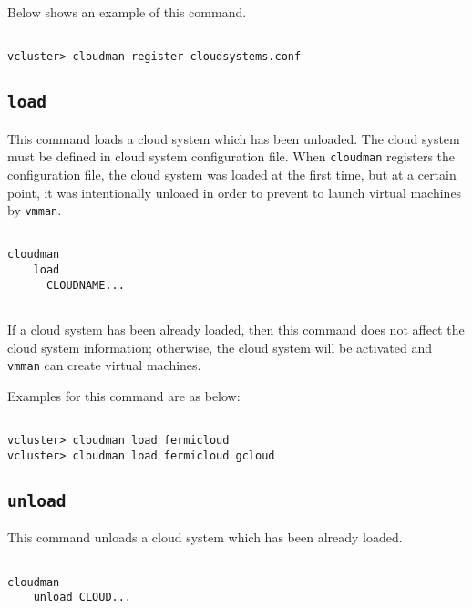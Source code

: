 \documentclass[11pt]{article}
\def \ttt{\texttt}
\def \vb{\verb}
\begin{document}
Below shows an example of this command.

\begin{Verbatim}[fontfamily=courier, fontsize = \small, obeytabs
=true, tabsize=4, frame=lines]

vcluster> cloudman register cloudsystems.conf

\end{Verbatim}



\subsection{\ttt{load}}
This command loads a cloud system which has been unloaded. The cloud system must be defined in cloud system configuration file. When \vb+cloudman+ registers the configuration file, the cloud system was loaded at the first time, but at a certain point, it was intentionally unloaed in order to prevent to launch virtual machines by \vb+vmman+. 

\begin{Verbatim}[fontfamily=courier, fontsize = \small, obeytabs
=true, tabsize=4, frame=lines]

cloudman 
    load
      CLOUDNAME... 
      
\end{Verbatim}

If a cloud system has been already loaded, then this command does not affect the cloud system information; otherwise, the cloud system will be activated and \vb+vmman+ can create virtual machines. 

Examples for this command are as below:


\begin{Verbatim}[fontfamily=courier, fontsize = \small, obeytabs
=true, tabsize=4, frame=lines]

vcluster> cloudman load fermicloud
vcluster> cloudman load fermicloud gcloud

\end{Verbatim}


\subsection{\ttt{unload}}
This command unloads a cloud system which has been already loaded. 

\begin{Verbatim}[fontfamily=courier, fontsize = \small, obeytabs
=true, tabsize=4, frame=lines]

cloudman 
    unload CLOUD...
      
\end{Verbatim}
\end{document}
